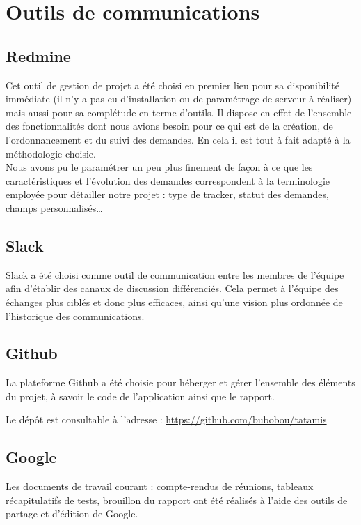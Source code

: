 \section{Outils de communications}

\subsection{Redmine}

Cet outil de gestion de projet a été choisi en premier lieu pour sa disponibilité immédiate (il n'y a pas eu d'installation
ou de paramétrage de serveur à réaliser) mais aussi pour sa complétude en terme d'outils. Il dispose
en effet de l'ensemble des fonctionnalités dont nous avions besoin pour ce qui est de la création, de l'ordonnancement
et du suivi des demandes. En cela il est tout à fait adapté à la méthodologie choisie.\\

Nous avons pu le paramétrer un peu plus finement de façon à ce que les caractéristiques et l'évolution des demandes
correspondent à la terminologie employée pour détailler notre projet : type de tracker, statut des demandes, champs personnalisés\dots


\subsection{Slack}

Slack a été choisi comme outil de communication entre les membres de l'équipe afin d'établir des canaux de discussion différenciés. 
Cela permet à l'équipe des échanges plus ciblés et donc plus efficaces, ainsi qu'une vision plus ordonnée de l'historique des communications.

\subsection{Github}

La plateforme Github a été choisie pour héberger et gérer l'ensemble des éléments du projet, à savoir
le code de l'application ainsi que le rapport.

Le dépôt est consultable à l'adresse : \url{https://github.com/bubobou/tatamis}

\subsection{Google}

Les documents de travail courant : compte-rendus de réunions, tableaux récapitulatifs de tests, brouillon 
du rapport ont été réalisés à l’aide des outils de partage et d’édition de Google.


